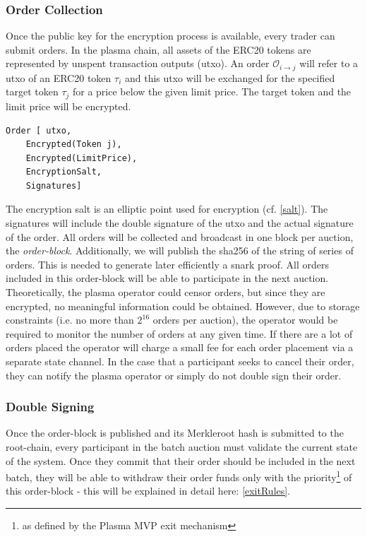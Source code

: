 \documentclass[11pt,parskip=full]{scrartcl}%
\def\pO{\mathcal{O}}
\def\ra{\rightarrow}
\newcommand*{\erc}{ERC20 }
\begin{document}
\subsubsection{Order Collection}
\label{orderblock}
Once the public key for the encryption process is available, every trader can submit orders. 
In the plasma chain, all assets of the ERC20 tokens are represented by unspent transaction outputs (utxo). 
An order $\pO_{i\ra j}$ will refer to a utxo of an \erc token $\tau_i$ and this utxo will be exchanged for the specified target token $\tau_j$ for a price below the given limit price. The target token and the limit price will be encrypted.

\begin{verbatim}
Order [ utxo,
    Encrypted(Token j),
    Encrypted(LimitPrice),
    EncryptionSalt,
    Signatures]
\end{verbatim} 
The encryption salt is an elliptic point used for encryption (cf. \ref{salt}). The signatures will include the double signature of the utxo and the actual signature of the order.
All orders will be collected and broadcast in one block per auction, the \emph{order-block}. Additionally, we will publish the sha256 of the string of series of orders. This is needed to generate later efficiently a snark proof.
All orders included in this order-block will be able to participate in the next auction. 
Theoretically, the plasma operator could censor orders, but since they are encrypted, no meaningful information could be obtained.
However, due to storage constraints (i.e. no more than $2^{16}$ orders per auction), the operator would be required to monitor the number of orders at any given time.
If there are a lot of orders placed the operator will charge a small fee for each order placement via a separate state channel. 
In the case that a participant seeks to cancel their order, they can notify the plasma operator or simply do not double sign their order. 

\subsubsection{Double Signing}
Once the order-block is published and its Merkleroot hash is submitted to the root-chain, every participant in the batch auction must validate the current state of the system. 
Once they commit that their order should be included in the next batch, they will be able to withdraw their order funds only with the priority\footnote{as defined by the Plasma MVP exit mechanism} of this order-block - this will be explained in detail here: \ref{exitRules}.
\end{document}
